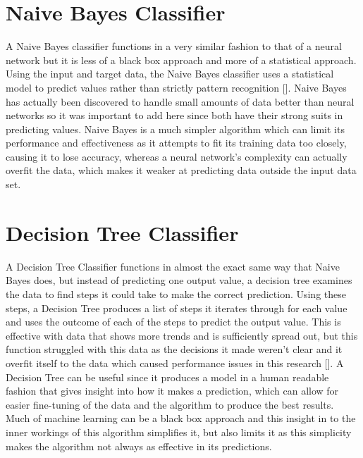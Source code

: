 \section{Naive Bayes Classifier}
A Naive Bayes classifier functions in a very similar fashion to that of a neural network but it is less of a black box approach and more of a statistical approach.
Using the input and target data, the Naive Bayes classifier uses a statistical model to predict values rather than strictly pattern recognition [\cite{murphy2006naive}].
Naive Bayes has actually been discovered to handle small amounts of data better than neural networks so it was important to add here since both have their strong suits in predicting values.
Naive Bayes is a much simpler algorithm which can limit its performance and effectiveness as it attempts to fit its training data too closely, causing it to lose accuracy, whereas a neural network's complexity can actually overfit the data, which makes it weaker at predicting data outside the input data set.

\section{Decision Tree Classifier}
A Decision Tree Classifier functions in almost the exact same way that Naive Bayes does, but instead of predicting one output value, a decision tree examines the data to find steps it could take to make the correct prediction.
Using these steps, a Decision Tree produces a list of steps it iterates through for each value and uses the outcome of each of the steps to predict the output value.
This is effective with data that shows more trends and is sufficiently spread out, but this function struggled with this data as the decisions it made weren't clear and it overfit itself to the data which caused performance issues in this research [\cite{dietterich1995overfitting}].
A Decision Tree can be useful since it produces a model in a human readable fashion that gives insight into how it makes a prediction, which can allow for easier fine-tuning of the data and the algorithm to produce the best results.
Much of machine learning can be a black box approach and this insight in to the inner workings of this algorithm simplifies it, but also limits it as this simplicity makes the algorithm not always as effective in its predictions.

